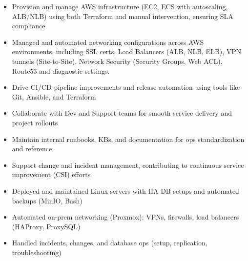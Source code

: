 \documentclass[10pt,a4paper,ragged2e,withhyper]{altacv}
\begin{document}


\makecvheader


\begin{paracol}{2}



\begin{itemize}
\item Provision and manage AWS infrastructure (EC2, ECS with autoscaling, ALB/NLB) using both Terraform and manual intervention, ensuring SLA compliance
\item Managed and automated networking configurations across AWS environments, including SSL certs, Load Balancers (ALB, NLB, ELB), VPN tunnels (Site-to-Site), Network Security (Security Groups, Web ACL), Route53 and diagnostic settings.
\item Drive CI/CD pipeline improvements and release automation using tools like Git, Ansible, and Terraform
\item Collaborate with Dev and Support teams for smooth service delivery and project rollouts
\item Maintain internal runbooks, KBs, and documentation for ops standardization and reference
\item Support change and incident management, contributing to continuous service improvement (CSI) efforts
\end{itemize}

\divider

\begin{itemize}
\item Deployed and maintained Linux servers with HA DB setups and automated backups (MinIO, Bash)

\item Automated on-prem networking (Proxmox): VPNs, firewalls, load balancers (HAProxy, ProxySQL)

\item Handled incidents, changes, and database ops (setup, replication, troubleshooting)


\end{itemize}
\end{paracol}
\end{document}
